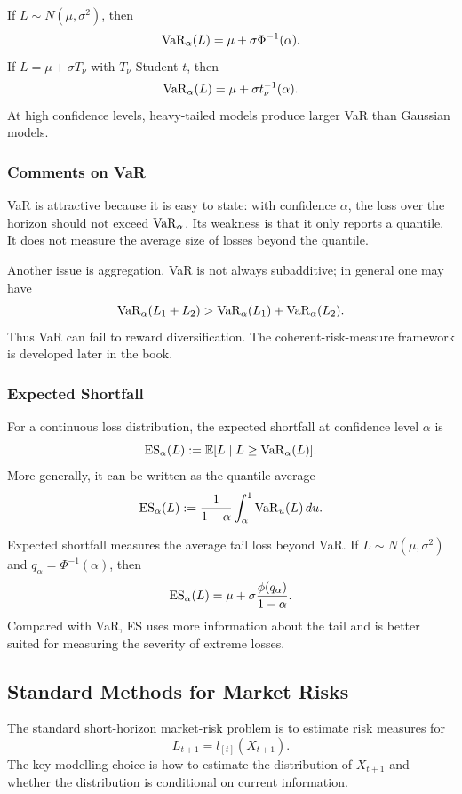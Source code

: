 If $L\sim N(\mu,\sigma^2)$, then
\[
    \operatorname{VaR}_\alpha(L)=\mu+\sigma\Phi^{-1}(\alpha).
\]
If $L=\mu+\sigma T_\nu$ with $T_\nu$ Student $t$, then
\[
    \operatorname{VaR}_\alpha(L)=\mu+\sigma t_\nu^{-1}(\alpha).
\]
At high confidence levels, heavy-tailed models produce larger VaR than Gaussian models.

\subsubsection{Comments on VaR}

VaR is attractive because it is easy to state: with confidence $\alpha$, the loss over the horizon should not exceed $\operatorname{VaR}_\alpha$. Its weakness is that it only reports a quantile. It does not measure the average size of losses beyond the quantile.

Another issue is aggregation. VaR is not always subadditive; in general one may have
\[
    \operatorname{VaR}_\alpha(L_1+L_2)>
    \operatorname{VaR}_\alpha(L_1)+\operatorname{VaR}_\alpha(L_2).
\]
Thus VaR can fail to reward diversification. The coherent-risk-measure framework is developed later in the book.

\subsubsection{Expected Shortfall}

\begin{definition}
For a continuous loss distribution, the expected shortfall at confidence level $\alpha$ is
\[
    \operatorname{ES}_\alpha(L)
    :=\mathbb{E}[L\mid L\ge \operatorname{VaR}_\alpha(L)].
\]
More generally, it can be written as the quantile average
\[
    \operatorname{ES}_\alpha(L)
    :=\frac{1}{1-\alpha}\int_\alpha^1 \operatorname{VaR}_u(L)\,du.
\]
\end{definition}

Expected shortfall measures the average tail loss beyond VaR. If $L\sim N(\mu,\sigma^2)$ and $q_\alpha=\Phi^{-1}(\alpha)$, then
\[
    \operatorname{ES}_\alpha(L)
    =\mu+\sigma\frac{\phi(q_\alpha)}{1-\alpha}.
\]
Compared with VaR, ES uses more information about the tail and is better suited for measuring the severity of extreme losses.

\subsection{Standard Methods for Market Risks}

The standard short-horizon market-risk problem is to estimate risk measures for
\[
    L_{t+1}=l_{[t]}(X_{t+1}).
\]
The key modelling choice is how to estimate the distribution of $X_{t+1}$ and whether the distribution is conditional on current information.

